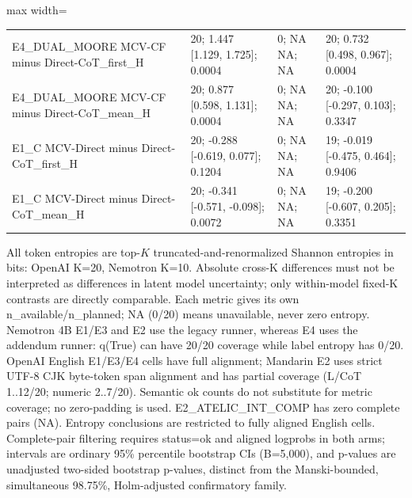 \documentclass[11pt,a4paper]{article}
\begin{document}
\begin{center}
\begin{adjustbox}{max width=\textwidth}
\begin{tabular}{llll}
E4\_\allowbreak{}DUAL\_\allowbreak{}MOORE MCV-CF minus Direct-CoT\_\allowbreak{}first\_\allowbreak{}H & 20; 1.447 [1.129, 1.725]; 0.0004 & 0; NA NA; NA & 20; 0.732 [0.498, 0.967]; 0.0004 \\
E4\_\allowbreak{}DUAL\_\allowbreak{}MOORE MCV-CF minus Direct-CoT\_\allowbreak{}mean\_\allowbreak{}H & 20; 0.877 [0.598, 1.131]; 0.0004 & 0; NA NA; NA & 20; -0.100 [-0.297, 0.103]; 0.3347 \\
E1\_\allowbreak{}C MCV-Direct minus Direct-CoT\_\allowbreak{}first\_\allowbreak{}H & 20; -0.288 [-0.619, 0.077]; 0.1204 & 0; NA NA; NA & 19; -0.019 [-0.475, 0.464]; 0.9406 \\
E1\_\allowbreak{}C MCV-Direct minus Direct-CoT\_\allowbreak{}mean\_\allowbreak{}H & 20; -0.341 [-0.571, -0.098]; 0.0072 & 0; NA NA; NA & 19; -0.200 [-0.607, 0.205]; 0.3351 \\
\bottomrule\end{tabular}\end{adjustbox}\endgroup\end{center}

All token entropies are top-$K$ truncated-and-renormalized Shannon entropies in bits: OpenAI K=20, Nemotron K=10. Absolute cross-K differences must not be interpreted as differences in latent model uncertainty; only within-model fixed-K contrasts are directly comparable. Each metric gives its own n\_\allowbreak{}available/n\_\allowbreak{}planned; NA (0/20) means unavailable, never zero entropy. Nemotron 4B E1/E3 and E2 use the legacy runner, whereas E4 uses the addendum runner: q(True) can have 20/20 coverage while label entropy has 0/20. OpenAI English E1/E3/E4 cells have full alignment; Mandarin E2 uses strict UTF-8 CJK byte-token span alignment and has partial coverage (L/CoT 1..12/20; numeric 2..7/20). Semantic ok counts do not substitute for metric coverage; no zero-padding is used. E2\_\allowbreak{}ATELIC\_\allowbreak{}INT\_\allowbreak{}COMP has zero complete pairs (NA). Entropy conclusions are restricted to fully aligned English cells. Complete-pair filtering requires status=ok and aligned logprobs in both arms; intervals are ordinary 95\% percentile bootstrap CIs (B=5,000), and p-values are unadjusted two-sided bootstrap p-values, distinct from the Manski-bounded, simultaneous 98.75\%, Holm-adjusted confirmatory family.



\end{document}
